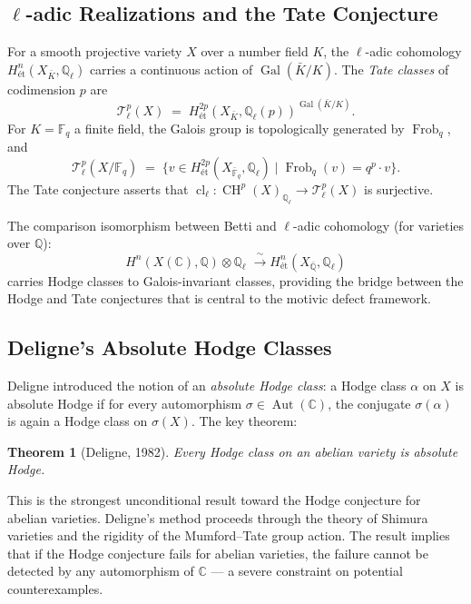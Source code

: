 \documentclass[11pt]{article}
\newtheorem{theorem}{Theorem}[section]
\theoremstyle{definition}
\DeclareMathOperator{\cl}{cl}
\DeclareMathOperator{\Gal}{Gal}
\DeclareMathOperator{\Frob}{Frob}
\DeclareMathOperator{\CH}{CH}
\DeclareMathOperator{\Aut}{Aut}
\begin{document}
\subsection{$\ell$-adic Realizations and the Tate Conjecture}
\label{sec:ell-adic-background}

For a smooth projective variety $X$ over a number field $K$, the
$\ell$-adic cohomology $H^n_{\text{\'et}}(X_{\bar{K}}, \mathbb{Q}_\ell)$
carries a continuous action of $\Gal(\bar{K}/K)$.  The \emph{Tate classes}
of codimension $p$ are
\[
  \mathcal{T}^p_\ell(X)
  \;=\;
  H^{2p}_{\text{\'et}}(X_{\bar{K}}, \mathbb{Q}_\ell(p))^{\Gal(\bar{K}/K)}.
\]
For $K = \mathbb{F}_q$ a finite field, the Galois group is topologically
generated by $\Frob_q$, and
\[
  \mathcal{T}^p_\ell(X/\mathbb{F}_q)
  \;=\;
  \bigl\{
    v \in H^{2p}_{\text{\'et}}(X_{\bar{\mathbb{F}}_q}, \mathbb{Q}_\ell)
    \;\big|\;
    \Frob_q(v) = q^p \cdot v
  \bigr\}.
\]
The Tate conjecture asserts that $\cl_\ell : \CH^p(X)_{\mathbb{Q}_\ell}
\to \mathcal{T}^p_\ell(X)$ is surjective.

The comparison isomorphism between Betti and $\ell$-adic cohomology
(for varieties over $\mathbb{Q}$):
\[
  H^n(X(\mathbb{C}), \mathbb{Q}) \otimes \mathbb{Q}_\ell
  \;\xrightarrow{\;\sim\;}
  H^n_{\text{\'et}}(X_{\bar{\mathbb{Q}}}, \mathbb{Q}_\ell)
\]
carries Hodge classes to Galois-invariant classes, providing the bridge
between the Hodge and Tate conjectures that is central to the motivic
defect framework.

\subsection{Deligne's Absolute Hodge Classes}

Deligne \cite{Deligne} introduced the notion of an \emph{absolute Hodge class}:
a Hodge class $\alpha$ on $X$ is absolute Hodge if for every automorphism
$\sigma \in \Aut(\mathbb{C})$, the conjugate $\sigma(\alpha)$ is again a
Hodge class on $\sigma(X)$.  The key theorem:

\begin{theorem}[Deligne, 1982]
Every Hodge class on an abelian variety is absolute Hodge.
\end{theorem}

This is the strongest unconditional result toward the Hodge conjecture for
abelian varieties.  Deligne's method proceeds through the theory of Shimura
varieties and the rigidity of the Mumford--Tate group action.  The result
implies that if the Hodge conjecture fails for abelian varieties, the failure
cannot be detected by any automorphism of $\mathbb{C}$ --- a severe constraint
on potential counterexamples.
\end{document}
